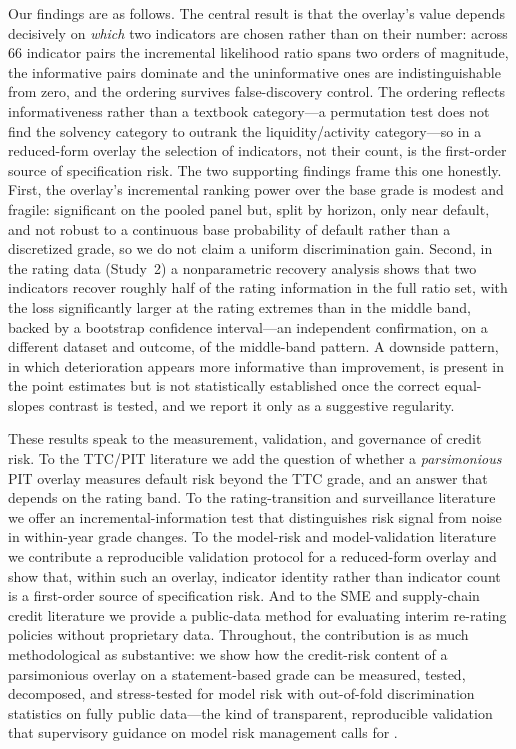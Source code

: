 \documentclass[pdflatex,sn-mathphys-ay]{sn-jnl}
\begin{document}
Our findings are as follows. The central result is that the overlay's value depends decisively on
\emph{which} two indicators are chosen rather than on their number: across 66 indicator pairs the
incremental likelihood ratio spans two orders of magnitude, the informative pairs dominate and the
uninformative ones are indistinguishable from zero, and the ordering survives false-discovery control.
The ordering reflects informativeness rather than a textbook category---a permutation test does not find
the solvency category to outrank the liquidity/activity category---so in a reduced-form overlay the
selection of indicators, not their count, is the first-order source of specification risk. The two
supporting findings frame this one honestly. First, the overlay's incremental ranking power over the
base grade is modest and fragile: significant on the pooled panel but, split by horizon, only near
default, and not robust to a continuous base probability of default rather than a discretized grade, so
we do not claim a uniform discrimination gain. Second, in the rating data (Study~2) a nonparametric
recovery analysis shows that two indicators recover roughly half of the rating information in the full
ratio set, with the loss significantly larger at the rating extremes than in the middle band, backed by
a bootstrap confidence interval---an independent confirmation, on a different dataset and outcome, of
the middle-band pattern. A downside pattern, in which deterioration appears more informative than
improvement, is present in the point estimates but is not statistically established once the correct
equal-slopes contrast is tested, and we report it only as a suggestive regularity.

These results speak to the measurement, validation, and governance of credit risk. To the TTC/PIT
literature \citep{altman2004stability,loffler2004anatomy,topp2010ttcpit} we add the question of whether a
\emph{parsimonious} PIT overlay measures default risk beyond the TTC grade, and an answer that depends on
the rating band. To the rating-transition and surveillance literature
\citep{lando2002transitions,guttler2007adjustment} we offer an incremental-information test that
distinguishes risk signal from noise in within-year grade changes. To the model-risk and
model-validation literature \citep{bcbs2005validation,sr2011modelrisk,blochlinger2006,danielsson2002} we
contribute a reproducible validation protocol for a reduced-form overlay and show that, within such an
overlay, indicator identity rather than indicator count is a first-order source of specification risk. And to the SME and
supply-chain credit literature \citep{altmansabato2007,berger2006} we provide a public-data method for
evaluating interim re-rating policies without proprietary data. Throughout, the contribution is as much
methodological as substantive: we show how the credit-risk content of a parsimonious overlay on a
statement-based grade can be measured, tested, decomposed, and stress-tested for model risk with
out-of-fold discrimination statistics on fully public data---the kind of transparent, reproducible
validation that supervisory guidance on model risk management calls for \citep{sr2011modelrisk}.
\end{document}
